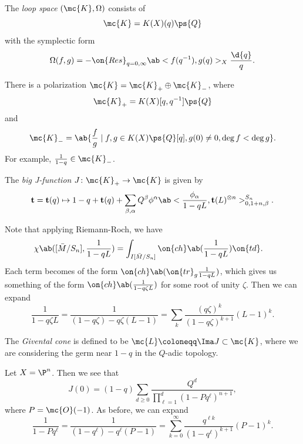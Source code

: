 \begin{defn}
    The \textit{loop space} \((\mc{K}, \Omega)\) consists of 
    \[ \mc{K} = K(X)(q) \ps{Q}\]
    with the symplectic form
    \[ \Omega(f, g) = - \on{Res}_{q = 0, \infty} \ab<f(q^{-1}), g(q)>_X \frac{\d{q}}{q}. \]
\end{defn}

\begin{rmk}
    There is a polarization \(\mc{K} = \mc{K}_+ \oplus \mc{K}_-\), where
    \[ \mc{K}_+ = K(X)[q, q^{-1}]\ps{Q} \]
    and
    \[ \mc{K}_- = \ab\{ \frac{f}{g} \mid f, g \in K(X)\ps{Q}[q], g(0) \neq 0, \deg f < \deg g\}. \]
    For example, \(\frac{1}{1-q} \in \mc{K}_-\).
\end{rmk}

\begin{defn}
    The \textit{big J-function} \(J \colon \mc{K}_+ \to \mc{K}\) is given by
    \[ \mathbf{t} = \mathbf{t}(q) \mapsto 1 - q + \mathbf{t}(q) + \sum_{\beta, \alpha} Q^{\beta} \phi^{\alpha} \ab< \frac{\phi_{\alpha}}{1-qL}, \mathbf{t}(L)^{\otimes n}>_{0, 1+n, \beta}^{S_n}. \]
\end{defn}

\begin{rmk}
    Note that applying Riemann-Roch, we have
    \begin{align*}
        \chi\ab([\bar{M}/S_n], \frac{1}{1-qL}) &= \int_{I[\bar{M}/S_n]} \on{ch}\ab(\frac{1}{1-qL}) \on{td}.
    \end{align*}
    Each term becomes of the form \(\on{ch}\ab(\on{tr}_g \frac{1}{1-qL})\), which gives us something of the form \(\on{ch}\ab(\frac{1}{1-q\zeta L})\) for some root of unity \(\zeta\). Then we can expand
    \[ \frac{1}{1-q\zeta L} = \frac{1}{(1-q \zeta) - q\zeta (L-1)} = \sum_k \frac{(q\zeta)^k}{(1-q\zeta)^{k+1}}(L-1)^k. \]
\end{rmk}

\begin{defn}
    The \textit{Givental cone} is defined to be \(\mc{L} \coloneqq \Ima J \subset \mc{K}\), where we are considering the germ near \(1-q\) in the \(Q\)-adic topology.
\end{defn}

\begin{exm}
    Let \(X = \P^n\). Then we see that
    \[ J(0) = (1-q) \sum_{d \geq 0} \frac{Q^d}{\prod_{\ell=1}^d (1-Pq^{\ell})^{n+1}}, \]
    where \(P = \mc{O}(-1)\). As before, we can expand
    \[ \frac{1}{1-P q^{\ell}} = \frac{1}{(1-q^{\ell}) - q^{\ell}(P-1)} = \sum_{k=0}^{\infty} \frac{q^{\ell k}}{(1-q^{\ell})^{k+1}}(P-1)^k. \]
\end{exm}

